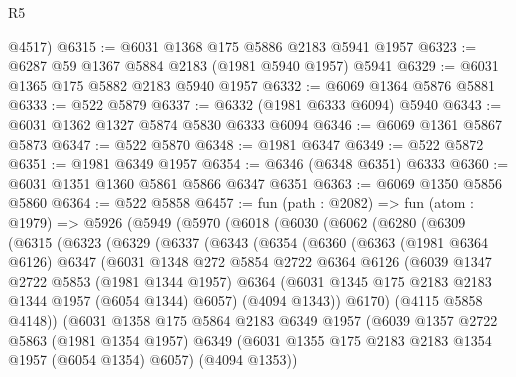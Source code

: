 \begin{lexlean}{R5}
\begin{coremodule}
      @4517)
@6315 := @6031 @1368 @175 @5886 @2183 @5941 @1957
@6323 := @6287 @59 @1367 @5884 @2183 (@1981 @5940 @1957) @5941
@6329 := @6031 @1365 @175 @5882 @2183 @5940 @1957
@6332 := @6069 @1364 @5876 @5881
@6333 := @522 @5879
@6337 := @6332 (@1981 @6333 @6094) @5940
@6343 := @6031 @1362 @1327 @5874 @5830 @6333 @6094
@6346 := @6069 @1361 @5867 @5873
@6347 := @522 @5870
@6348 := @1981 @6347
@6349 := @522 @5872
@6351 := @1981 @6349 @1957
@6354 := @6346 (@6348 @6351) @6333
@6360 := @6031 @1351 @1360 @5861 @5866 @6347 @6351
@6363 := @6069 @1350 @5856 @5860
@6364 := @522 @5858
@6457 := fun (path : @2082) =>
  fun (atom : @1979) =>
  @5926
    (@5949
      (@5970
        (@6018
          (@6030
            (@6062
              (@6280
                (@6309
                  (@6315
                    (@6323
                      (@6329
                        (@6337
                          (@6343
                            (@6354
                              (@6360
                                (@6363
                                  (@1981 @6364 @6126)
                                  @6347
                                  (@6031
                                    @1348
                                    @272
                                    @5854
                                    @2722
                                    @6364
                                    @6126
                                    (@6039
                                      @1347
                                      @2722
                                      @5853
                                      (@1981 @1344 @1957)
                                      @6364
                                      (@6031 @1345 @175 @2183 @2183 @1344 @1957 (@6054 @1344) @6057)
                                      (@4094 @1343))
                                    @6170)
                                  (@4115 @5858 @4148))
                                (@6031
                                  @1358
                                  @175
                                  @5864
                                  @2183
                                  @6349
                                  @1957
                                  (@6039
                                    @1357
                                    @2722
                                    @5863
                                    (@1981 @1354 @1957)
                                    @6349
                                    (@6031 @1355 @175 @2183 @2183 @1354 @1957 (@6054 @1354) @6057)
                                    (@4094 @1353))

\end{coremodule}
\end{lexlean}
